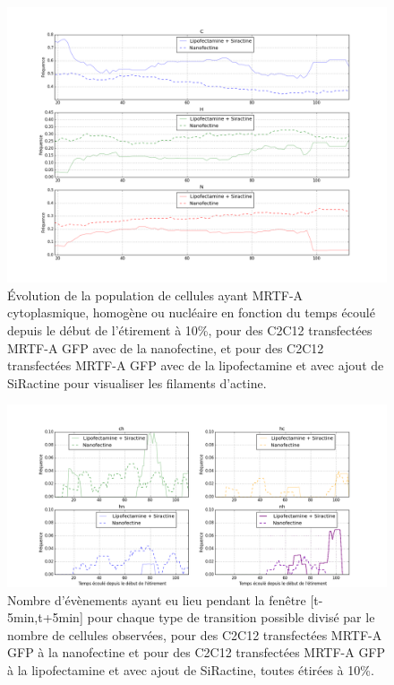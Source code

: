 \begin{figure}
\includegraphics[scale=0.3]{Figures/Et10_Siractine_comparaison.png}
\caption{\'Evolution de la population de cellules ayant MRTF-A cytoplasmique, homogène ou nucléaire en fonction du temps écoulé depuis le début de l'étirement à 10\%, pour des C2C12 transfectées MRTF-A GFP avec de la nanofectine, et pour des C2C12 transfectées MRTF-A GFP avec de la lipofectamine et avec ajout de SiRactine pour visualiser les filaments d'actine. \label{CHN_SiR}}
\end{figure}

\begin{figure}
\includegraphics[scale=0.3]{Figures/Et10_transloc_Siractine.png} 
\caption{Nombre d'évènements ayant eu lieu pendant la fenêtre [t-5min,t+5min] pour chaque type de transition possible divisé par le nombre de cellules observées, pour des C2C12 transfectées MRTF-A GFP à la nanofectine et pour des C2C12 transfectées MRTF-A GFP à la lipofectamine et avec ajout de SiRactine, toutes étirées à 10\%. \label{transloc_Sir}}
\end{figure}

